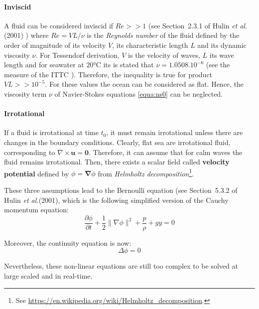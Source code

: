 \documentclass[final]{jcgt}
\def\etal{\emph{et al.}\xspace}
\begin{document}
\paragraph{Inviscid}
A fluid can be considered inviscid if $Re>>1$ (see Section~2.3.1 of Hulin \etal (2001) \cite{hulinHydrodynamiquePhysique2001}) where $Re=VL/\nu$ is the \emph{Reynolds number} of the fluid defined by the order of magnitude of its velocity $V$, its characteristic length $L$ and its dynamic viscosity $\nu$.
For Tessendorf derivation, $V$ is the velocity of waves, $L$ its wave length and for seawater at $20$°C its is stated that $\nu=1.0508.10^{-6}$ (see the measure of the ITTC \cite{ittcFreshWaterSeawater2011}).
Therefore, the inequality is true for product $VL >> 10^{-5}$.
For these values the ocean can be considered as flat.
Hence, the viscosity term $\nu$ of Navier-Stokes equations \ref{equa:ns0} can be neglected.

\paragraph{Irrotational}
If a fluid is irrotational at time $t_0$, it must remain irrotational unless there are changes in the boundary conditions.
Clearly, flat sea are irrotational fluid, corresponding to $\nabla\times\mathbf{u} = \mathbf{0}$.
Therefore, it can assume that for calm waves the fluid remains irrotational.
Then, there exists a scalar field called \textbf{velocity potential} defined by $\phi = \mathbf{\nabla} \phi$ from \emph{Helmholtz decomposition}\footnote{See \url{https://en.wikipedia.org/wiki/Helmholtz_decomposition}.}.

These three assumptions lead to the Bernoulli equation (see Section~5.3.2 of Hulin \etal (2001), which is the following simplified version of the Cauchy momentum equation:
\begin{equation}
	\frac{\partial \phi}{\partial t} + \frac{1}{2}\|\nabla\phi\|^2 + \frac{p}{\rho} + gy = 0
	\label{equa:bernoulli}
\end{equation}

Moreover, the continuity equation is now:
\begin{equation}
	\Delta \phi = 0 \label{equa:continuityS}
\end{equation}

Nevertheless, these non-linear equations are still too complex to be solved at large scaled and in real-time.

\end{document}

